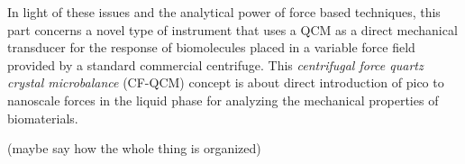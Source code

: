 In light of these issues and the analytical power of force based
techniques, this part concerns a novel type of instrument that uses a QCM
as a direct mechanical transducer for the response of biomolecules placed
in a variable force field provided by a standard commercial centrifuge.
This \textit{centrifugal force quartz crystal microbalance} (CF-QCM)
concept is about direct introduction of pico to nanoscale forces in the
liquid phase for analyzing the mechanical properties of biomaterials.

(maybe say how the whole thing is organized)
